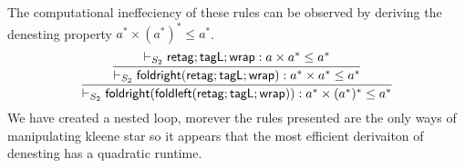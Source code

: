 \begin{example}[Kozen]
The computational ineffeciency of these rules can be observed by deriving the denesting property $a ^* \times (a^*)^* \leq a^*$. 
\[\infer{\containsP{}{\dslcom{foldright}(\dslcom{foldleft}(\dslcom{retag};\dslcom{tagL};\dslcom{wrap}))}{a^* \times (a^*)^*}{a^*}{S_2}}{\infer{\containsP{}{\dslcom{foldright}(\dslcom{retag};\dslcom{tagL};\dslcom{wrap})}{a^* \times a^*}{a^*}{S_2}}{\containsP{}{\dslcom{retag};\dslcom{tagL};\dslcom{wrap}}{a \times a^*}{a^*}{S_2}}} \]
We have created a nested loop, morever the rules presented are the only ways of manipulating kleene star so it appears that the most efficient derivaiton of denesting has a quadratic runtime.
\end{example}
